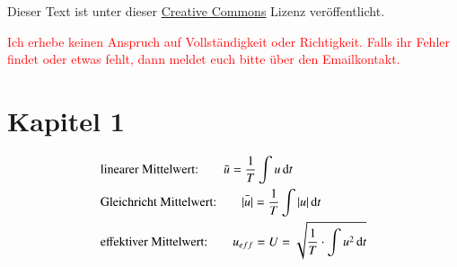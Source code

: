 




\maketitle

Dieser Text ist unter dieser \href{http://creativecommons.org/licenses/by-nc-sa/4.0/}{Creative Commons} Lizenz veröffentlicht.

\textcolor{red}{Ich erhebe keinen Anspruch auf Vollständigkeit oder Richtigkeit. Falls ihr Fehler findet oder etwas fehlt, dann meldet euch bitte über den Emailkontakt.}

\tableofcontents


\newpage

\section{Kapitel 1}


\begin{align*}
&\text{linearer Mittelwert:} \qquad \bar{u} = \frac{1}{T} \int u \, \mathrm d t \\
&\text{Gleichricht Mittelwert:} \qquad \bar{|u|} = \frac{1}{T} \int |u| \, \mathrm d t  \\
&\text{effektiver Mittelwert:} \qquad u_{eff} = U = \sqrt{\frac{1}{T} \cdot \int u^2 \, \mathrm d t} 
\end{align*}






















